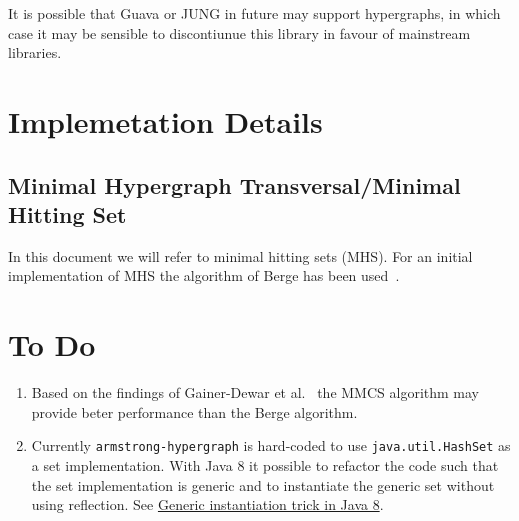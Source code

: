 \documentclass[a4paper,10pt,final,onecolumn]{llncs}
\begin{document}
  It is possible that Guava or JUNG in future may support hypergraphs, in which case it may be sensible to discontiunue this library in favour of mainstream libraries.
  
  \section{Implemetation Details}
  \subsection{Minimal Hypergraph Transversal/Minimal Hitting Set}
  In this document we will refer to minimal hitting sets (MHS).
  For an initial implementation of MHS the algorithm of Berge has been used~\cite{Berge1989,Hagen2009,Gainer-Dewar2016}. 
  
  \section{To Do}
  \begin{enumerate}
   \item Based on the findings of Gainer-Dewar et al.~\cite{Gainer-Dewar2016} the MMCS algorithm may provide beter performance than the Berge algorithm.
   \item Currently \texttt{armstrong-hypergraph} is hard-coded to use \texttt{java.util.HashSet} as a set implementation. With Java 8 it possible to refactor the code such that the set implementation is generic and to instantiate the generic set without using reflection. See \href{https://stackoverflow.com/questions/75175/create-instance-of-generic-type-in-java}{Generic instantiation trick in Java 8}.
  \end{enumerate}

    
        
      
\end{document}
